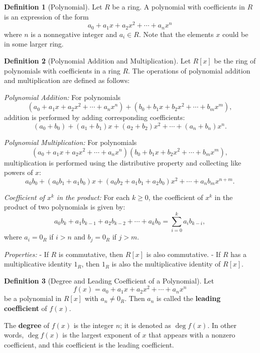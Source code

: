 \documentclass{article}
\theoremstyle{definition}
\newtheorem{definition}{Definition}[section]
\theoremstyle{remark}
\begin{document}
\begin{definition}[Polynomial]
Let $R$ be a ring. A polynomial with coefficients in $R$ is an expression of the form
\[
a_0 + a_1x + a_2x^2 + \cdots + a_nx^n
\]
where $n$ is a nonnegative integer and $a_i \in R$. Note that the elements
$x$ could be in some larger ring. 
\end{definition}






\begin{definition}[Polynomial Addition and Multiplication]
Let $R[x]$ be the ring of polynomials with coefficients in a ring $R$. The operations of polynomial addition and multiplication are defined as follows:

\textit{Polynomial Addition:}  
For polynomials
\[
(a_0 + a_1x + a_2x^2 + \cdots + a_nx^n) + (b_0 + b_1x + b_2x^2 + \cdots + b_mx^m),
\]
addition is performed by adding corresponding coefficients:
\[
(a_0 + b_0) + (a_1 + b_1)x + (a_2 + b_2)x^2 + \cdots + (a_n + b_n)x^n.
\]

\textit{Polynomial Multiplication:}  
For polynomials
\[
(a_0 + a_1x + a_2x^2 + \cdots + a_nx^n)(b_0 + b_1x + b_2x^2 + \cdots + b_mx^m),
\]
multiplication is performed using the distributive property and collecting like powers of $x$:
\[
a_0b_0 + (a_0b_1 + a_1b_0)x + (a_0b_2 + a_1b_1 + a_2b_0)x^2 + \cdots + a_n b_m x^{n+m}.
\]

\textit{Coefficient of $x^k$ in the product:}  
For each $k \geq 0$, the coefficient of $x^k$ in the product of two polynomials is given by:
\[
a_0b_k + a_1b_{k-1} + a_2b_{k-2} + \cdots + a_k b_0 = \sum_{i=0}^{k} a_i b_{k-i},
\]
where $a_i = 0_R$ if $i > n$ and $b_j = 0_R$ if $j > m$.

\textit{Properties:}
- If $R$ is commutative, then $R[x]$ is also commutative.
- If $R$ has a multiplicative identity $1_R$, then $1_R$ is also the multiplicative identity of $R[x]$.
\end{definition}


\begin{definition}[Degree and Leading Coefficient of a Polynomial]
Let 
\[
f(x) = a_0 + a_1x + a_2x^2 + \cdots + a_nx^n
\]
be a polynomial in $R[x]$ with $a_n \neq 0_R$. Then $a_n$ is called the \textbf{leading coefficient} of $f(x)$. 

The \textbf{degree} of $f(x)$ is the integer $n$; it is denoted as $\deg f(x)$. In other words, $\deg f(x)$ is the largest exponent of $x$ that appears with a nonzero coefficient, and this coefficient is the leading coefficient.
\end{definition}
\end{document}
